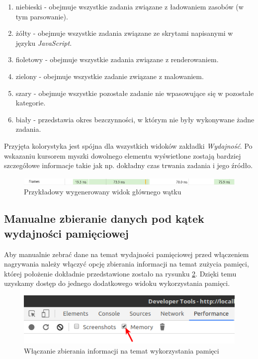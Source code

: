 \documentclass[polish, twoside, 12pt]{mwart}
\begin{document}
\begin{enumerate}
  \item niebieski - obejmuje wszystkie zadania związane z ładowaniem zasobów (w tym parsowanie).
  \item żółty - obejmuje wszystkie zadania związane ze skrytami napisanymi w języku \emph{JavaScript}.
  \item fioletowy - obejmuje wszystkie zadania związane z renderowaniem.
  \item zielony - obejmuje wszystkie zadanie związane z malowaniem.
  \item szary - obejmuje wszystkie pozostałe zadanie nie wpasowujące się w pozostałe kategorie.
  \item biały - przedstawia okres bezczynności, w którym nie były wykonywane żadne zadania.
\end{enumerate}

Przyjęta kolorystyka jest spójna dla wszystkich widoków zakładki \emph{Wydajność}. Po wskazaniu kursorem myszki dowolnego elementu wyświetlone zostają bardziej szczegółowe informacje takie jak np. dokładny czas trwania zadania i jego źródło.

\begin{figure}[ht]
  \includegraphics[width=\textwidth]{chrome-devtools-performance-frames-view.png}
  \caption{Przykładowy wygenerowany widok głównego wątku}
  \label{fig:chrome-devtools-performance-frames-view}
\end{figure}

\subsection{Manualne zbieranie danych pod kątek wydajności pamięciowej}

Aby manualnie zebrać dane na temat wydajności pamięciowej przed włączeniem nagrywania należy włączyć opcję zbierania informacji na temat zużycia pamięci, której położenie dokładnie przedstawione zostało na rysunku \ref{fig:chrome-devtools-performance-memory-checkbox}. Dzięki temu uzyskamy dostęp do jednego dodatkowego widoku wykorzystania pamięci.

\begin{figure}[ht]
  \includegraphics[width=\textwidth]{chrome-devtools-performance-memory-checkbox.png}
  \caption{Włączanie zbierania informacji na temat wykorzystania pamięci}
  \label{fig:chrome-devtools-performance-memory-checkbox}
\end{figure}
\end{document}
